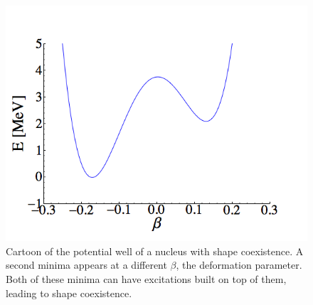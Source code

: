 \begin{figure}
    \centering
    \includegraphics[scale=0.5]{Introduction_Figs/ShapeCoexist.png}
    \caption{Cartoon of the potential well of a nucleus with shape coexistence. A second minima appears at a different $\beta$, the deformation parameter. Both of these minima can have excitations built on top of them, leading to shape coexistence.}
    \label{fig:shape}
\end{figure}